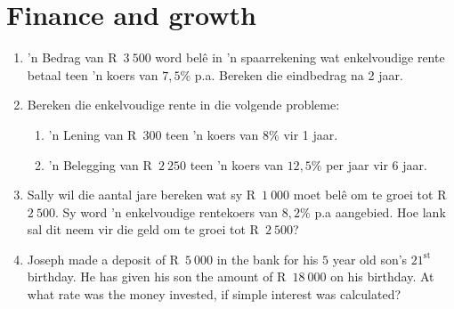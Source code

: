 \chapter{Finance and growth}
\begin{exercises}{}{
    \begin{enumerate}[itemsep=6pt, label=\textbf{\arabic*}.]
	\item ’n Bedrag van R~$3~500$ word belê in ’n spaarrekening wat enkelvoudige rente betaal teen ’n koers van $7,5\%$ p.a. Bereken die eindbedrag na 2 jaar.

	\item Bereken die enkelvoudige rente in die volgende probleme:
	\begin{enumerate}
	    \item ’n Lening van R~$300$  teen ’n koers van $8\%$ vir 1 jaar.

	    \item ’n Belegging van R~$2~250$ teen ’n koers van $12,5\%$ per jaar vir 6 jaar.
	\end{enumerate}

	\item Sally wil die aantal jare bereken wat sy R~$1~000$ moet bel\^e om te groei tot R~$2~500$. Sy word 'n enkelvoudige rentekoers van $8,2\%$ p.a aangebied. Hoe lank sal dit neem vir die geld om te groei tot R~$2~500$?
	\item Joseph made a deposit of R~$5~000$ in the bank for his $5$ year old son's $21^{\mathrm{st}}$ birthday. He has given his son the amount of R~$18~000$ on his birthday. At what rate was the money invested, if simple interest was calculated?
    \end{enumerate}
}
\end{exercises}


